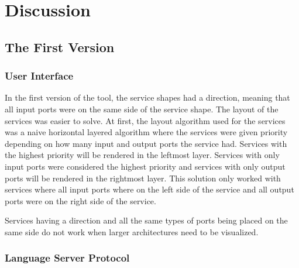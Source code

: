 \chapter{Discussion}

\section{The First Version}

\subsection{User Interface}
In the first version of the tool, the service shapes had a direction, meaning that all input ports were on the same side of the service shape. The layout of the services was easier to solve.
At first, the layout algorithm used for the services was a naive horizontal layered algorithm where the services were given priority depending on how many input and output ports the service had.
Services with the highest priority will be rendered in the leftmost layer. Services with only input ports were considered the highest priority and services with only output ports will be rendered in the rightmost layer.
This solution only worked with services where all input ports where on the left side of the service and all output ports were on the right side of the service.

Services having a direction and all the same types of ports being placed on the same side do not work when larger architectures need to be visualized.

\subsection{Language Server Protocol}